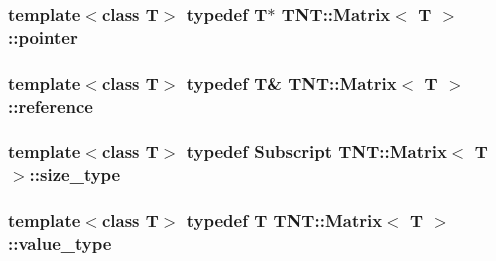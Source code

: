 \hypertarget{classTNT_1_1Matrix_aa7db7adc5513f7d8bf067965b97d7c42}{
\subsubsection[{pointer}]{\setlength{\rightskip}{0pt plus 5cm}template$<$class T$>$ typedef T$\ast$ {\bf T\-N\-T\-::\-Matrix}$<$ T $>$\-::{\bf pointer}}}\label{classTNT_1_1Matrix_aa7db7adc5513f7d8bf067965b97d7c42}
\hypertarget{classTNT_1_1Matrix_a129951783800dd85d3dcc1f6dd2062f9}{
\subsubsection[{reference}]{\setlength{\rightskip}{0pt plus 5cm}template$<$class T$>$ typedef T\& {\bf T\-N\-T\-::\-Matrix}$<$ T $>$\-::{\bf reference}}}\label{classTNT_1_1Matrix_a129951783800dd85d3dcc1f6dd2062f9}
\hypertarget{classTNT_1_1Matrix_a42f57fd19de0ba2edce3734f41431727}{
\subsubsection[{size\-\_\-type}]{\setlength{\rightskip}{0pt plus 5cm}template$<$class T$>$ typedef {\bf Subscript} {\bf T\-N\-T\-::\-Matrix}$<$ T $>$\-::{\bf size\-\_\-type}}}\label{classTNT_1_1Matrix_a42f57fd19de0ba2edce3734f41431727}
\hypertarget{classTNT_1_1Matrix_a869b1a3e56a38bdaeb0b4f698b08e3c5}{
\subsubsection[{value\-\_\-type}]{\setlength{\rightskip}{0pt plus 5cm}template$<$class T$>$ typedef T {\bf T\-N\-T\-::\-Matrix}$<$ T $>$\-::{\bf value\-\_\-type}}}\label{classTNT_1_1Matrix_a869b1a3e56a38bdaeb0b4f698b08e3c5}


